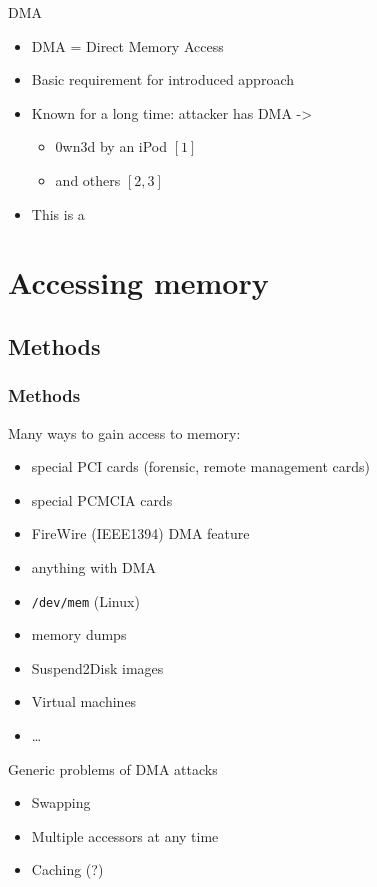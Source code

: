 \documentclass{beamer}
\newenvironment{itemizeframe}[1]
  {\begin{frame}{#1}\startitemizeframe}
  {\stopitemizeframe\end{frame}}
\newcommand\startitemizeframe{\begin{itemize}}
\newcommand\stopitemizeframe{\end{itemize}}
\begin{document}
		\begin{itemizeframe}{DMA}
			\item DMA = Direct Memory Access
			\item Basic requirement for introduced approach
			\item Known for a long time: attacker has DMA -> 
				\begin{itemize}
					\item 0wn3d by an iPod $[1]$
					\item and others $[2,3]$
				\end{itemize}
			\item This is a 
		\end{itemizeframe}

\section{Accessing memory}

	\subsection{Methods}

		\begin{frame} \frametitle{Methods}
			Many ways to gain access to memory:
			\begin{itemize}
				\item special PCI cards (forensic, remote management cards)
				\item special PCMCIA cards
				\item FireWire (IEEE1394) DMA feature
				\item anything with DMA
				\item \texttt{/dev/mem} (Linux)
				\item memory dumps
				\item Suspend2Disk images
				\item Virtual machines
				\item \ldots
			\end{itemize}
		\end{frame}

		\begin{itemizeframe}{Generic problems of DMA attacks}
			\item Swapping
			\item Multiple accessors at any time
			\item Caching (?)
		\end{itemizeframe}
\end{document}
